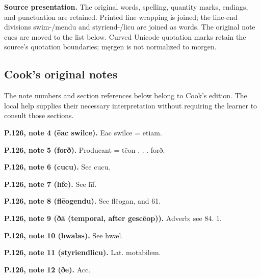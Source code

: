 \textbf{Source presentation.} The original words, spelling, quantity marks, endings, and punctuation are retained. Printed line wrapping is joined; the line-end divisions swim-/\allowbreak{}mendu and styriend-/\allowbreak{}licu are joined as words. The original note cues are moved to the list below. Curved Unicode quotation marks retain the source’s quotation boundaries; męrgen is not normalized to morgen.

\subsection*{Cook’s original notes}

The note numbers and section references below belong to Cook’s edition. The local help supplies their necessary interpretation without requiring the learner to consult those sections.

\textbf{P.126, note 4 (ēac swilce).} Ēac swilce = etiam.

\textbf{P.126, note 5 (forð).} Producant = tēon . . . forð.

\textbf{P.126, note 6 (cucu).} See cucu.

\textbf{P.126, note 7 (līfe).} See līf.

\textbf{P.126, note 8 (flēogendu).} See flēogan, and 61.

\textbf{P.126, note 9 (ðā (temporal, after gescēop)).} Adverb; see 84. 1.

\textbf{P.126, note 10 (hwalas).} See hwæl.

\textbf{P.126, note 11 (styriendlicu).} Lat. motabilem.

\textbf{P.126, note 12 (ðe).} Acc.

